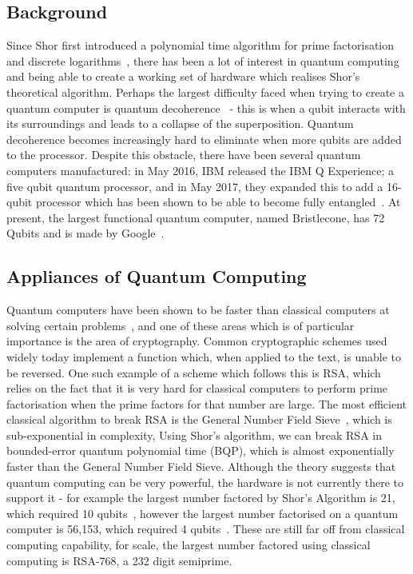 \subsection{Background}
Since Shor first introduced a polynomial time algorithm for prime factorisation and discrete logarithms~\cite{shor1999polynomial}, there has been a lot of interest in quantum computing and being able to create a working set of hardware which realises Shor's theoretical algorithm. Perhaps the largest difficulty faced when trying to create a quantum computer is quantum decoherence~\cite{ponnath2006difficulties} - this is when a qubit interacts with its surroundings and leads to a collapse of the superposition. Quantum decoherence becomes increasingly hard to eliminate when more qubits are added to the processor. Despite this obstacle, there have been several quantum computers manufactured: in May 2016, IBM released the IBM Q Experience; a five qubit quantum processor, and in May 2017, they expanded this to add a 16-qubit processor which has been shown to be able to become fully entangled~\cite{wang201816}. At present, the largest functional quantum computer, named Bristlecone, has 72 Qubits and is made by Google~\cite{bristlecone2018}.
\subsection{Appliances of Quantum Computing}
Quantum computers have been shown to be faster than classical computers at solving certain problems~\cite{Bravyi308}, and one of these areas which is of particular importance is the area of cryptography. Common cryptographic schemes used widely today implement a function which, when applied to the text, is unable to be reversed. One such example of a scheme which follows this is RSA, which relies on the fact that it is very hard for classical computers to perform prime factorisation when the prime factors for that number are large. The most efficient classical algorithm to break RSA is the General Number Field Sieve~\cite{GNFS2006}, which is sub-exponential in complexity, Using Shor's algorithm, we can break RSA in bounded-error quantum polynomial time (BQP), which is almost exponentially faster than the General Number Field Sieve.
Although the theory suggests that quantum computing can be very powerful, the hardware is not currently there to support it - for example the largest number factored by Shor's Algorithm is 21, which required 10 qubits~\cite{21factorshors2012}, however the largest number factorised on a quantum computer is 56,153, which required 4 qubits~\cite{dattani2014quantum}. These are still far off from classical computing capability, for scale, the largest number factored using classical computing is RSA-768, a 232 digit semiprime. 
